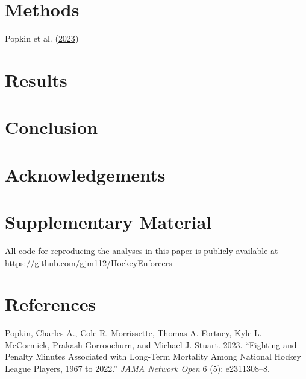 \documentclass[
  12pt,
]{article}
\newlength{\cslhangindent}
\newlength{\cslentryspacingunit} %
\newenvironment{CSLReferences}[2] %
 {%
  \setlength{\parindent}{0pt}
  \ifodd #1
  \let\oldpar\par
  \def\par{\hangindent=\cslhangindent\oldpar}
  \fi
  \setlength{\parskip}{#2\cslentryspacingunit}
 }%
 {}
\begin{document}
\hypertarget{sec:methods}{%
\section{Methods}\label{sec:methods}}

Popkin et al. (\protect\hyperlink{ref-Popkin2023}{2023})

\hypertarget{sec:results}{%
\section{Results}\label{sec:results}}

\hypertarget{sec:conclusion}{%
\section{Conclusion}\label{sec:conclusion}}

\hypertarget{acknowledgements}{%
\section*{Acknowledgements}\label{acknowledgements}}

\hypertarget{supplementary-material}{%
\section*{Supplementary Material}\label{supplementary-material}}

All code for reproducing the analyses in this paper is publicly
available at \url{https://github.com/gjm112/HockeyEnforcers}

\hypertarget{references}{%
\section*{References}\label{references}}

\hypertarget{refs}{}
\begin{CSLReferences}{1}{0}
\leavevmode{}%
Popkin, Charles A., Cole R. Morrissette, Thomas A. Fortney, Kyle L.
McCormick, Prakash Gorroochurn, and Michael J. Stuart. 2023. {``Fighting
and Penalty Minutes Associated with Long-Term Mortality Among National
Hockey League Players, 1967 to 2022.''} \emph{JAMA Network Open} 6 (5):
e2311308--8.

\end{CSLReferences}
\end{document}
